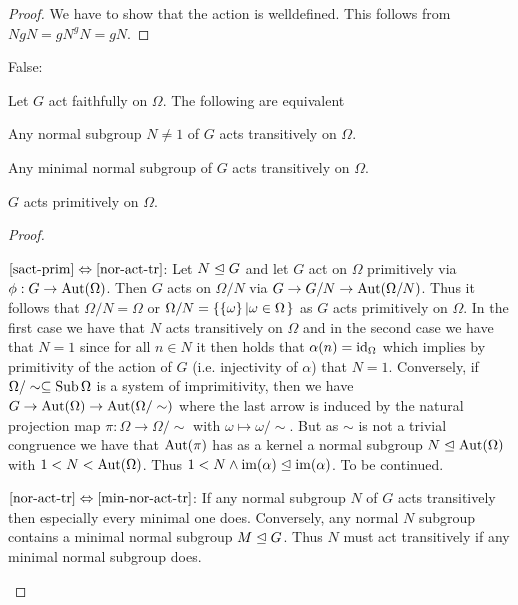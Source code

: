 \documentclass[8pt,a4paper]{article}
\begin{document}
\begin{proof}\label{bew}
    We have to show that the action is welldefined. This follows from $NgN=gN^gN=gN$.
\end{proof}

False:
\begin{lemma}
    Let $G$ act faithfully on $\Omega$.
    The following are equivalent
    \begin{statements}
            \item\label{nor-act-tr} Any normal subgroup $N\neq 1$ of $G$ acts transitively on $\Omega$.
            \item\label{min-nor-act-tr} Any minimal normal subgroup of $G$ acts transitively on $\Omega$.
            \item\label{sact-prim} $G$ acts primitively on $\Omega$.
    \end{statements}
\end{lemma}

\begin{proof}
    \begin{implications}
            \item[$\ref{sact-prim}\Leftrightarrow\ref{nor-act-tr}$:]
        Let $N\trianglelefteq G$ and let $G$ act on $\Omega$ primitively via $\phi:G\rightarrow\mathop\mathrm{Aut}\nolimits(\Omega)$. Then $G$ acts on $\Omega/N$ via $G\rightarrow G/N\rightarrow \mathop\mathrm{Aut}\nolimits(\Omega/N)$. Thus it follows that $\Omega/N=\Omega$ or $\Omega/N=\set{\set{\omega}}[\omega\in \Omega]$ as $G$ acts primitively on $\Omega$. In the first case we have that $N$ acts transitively on $\Omega$ and in the second case we have that $N=1$ since for all $n\in N$ it then holds that $\alpha(n)=\mathop\mathrm{id}\nolimits_{\Omega}$ which implies by primitivity of the action of $G$ (i.e. injectivity of $\alpha$) that $N=1$.
        Conversely, if $\Omega/\sim\subseteq \mathop\mathrm{Sub}\nolimits{\Omega}$ is a system of imprimitivity, then we have $G\rightarrow \mathop\mathrm{Aut}\nolimits(\Omega)\rightarrow\mathop\mathrm{Aut}\nolimits(\Omega/\sim)$ where the last arrow is induced by the natural projection map $\pi:\Omega\to\Omega/\sim$ with $\omega\mapsto \omega/\sim$. But as $\sim$ is not a trivial congruence we have that $\mathop\mathrm{Aut}\nolimits(\pi)$ has as a kernel a normal subgroup $N\trianglelefteq \mathop\mathrm{Aut}\nolimits(\Omega)$ with $1< N< \mathop\mathrm{Aut}\nolimits(\Omega)$. Thus $1<N\wedge \mathop\mathrm{im}(\alpha)\trianglelefteq \mathop\mathrm{im}(\alpha)$.
        To be continued.

        
            \item[$\ref{nor-act-tr}\Leftrightarrow\ref{min-nor-act-tr}$:]
        If any normal subgroup $N$ of $G$ acts transitively then especially every minimal one does. Conversely, any normal $N$ subgroup contains a minimal normal subgroup $M\trianglelefteq G$. Thus $N$ must act transitively if any minimal normal subgroup does.
\end{implications}
\end{proof}
\end{document}
